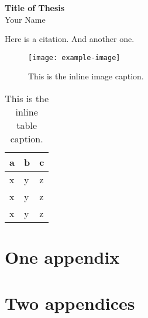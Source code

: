 \documentclass{uscf}
\begin{document}
\clearpage
\begin{centering}
  \textbf{Title of Thesis}\\
  Your Name\\
\end{centering}
\bigskip
\blindtext

\tableofcontents
\listoftables
\listoffigures

\mainmatter

\Blinddocument

\blindtext

Here is a citation\cite{einstein}.
And another one\cite{dirac}.

\blindtext

\begin{figure}\centering
  \texttt{[image: example-image]}
  \caption[This is the index image title.]{This is the inline image caption.}
\end{figure}

\blindtext

\begin{table}\centering
  \begin{tabular}{lll}\toprule
    a & b & c \\\midrule
    x & y & z \\
    x & y & z \\
    x & y & z \\\bottomrule
  \end{tabular}
  \caption[This is the index table title.]{This is the inline table caption.}
\end{table}






\printbibliography[heading=bibintoc]

\appendix

\chapter{One appendix}

\blindtext

\chapter{Two appendices}
\end{document}
